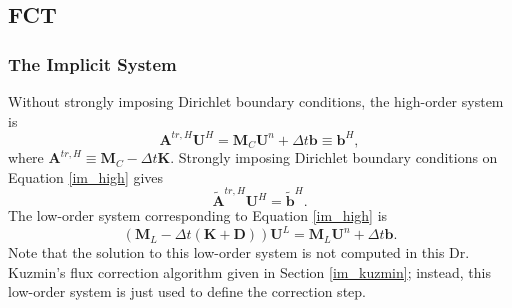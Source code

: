 \subsection{FCT}
\subsubsection{The Implicit System}
Without strongly imposing Dirichlet boundary conditions, the high-order system is
\begin{equation}\label{im_high}
   \mathbf{A}^{tr,H}\mathbf{U}^H
      = \mathbf{M}_C\mathbf{U}^n + \Delta t\mathbf{b} \equiv \mathbf{b}^H,
\end{equation}
where $\mathbf{A}^{tr,H} \equiv \mathbf{M}_C-\Delta t\mathbf{K}$.
Strongly imposing Dirichlet boundary conditions on Equation \ref{im_high}
gives
\begin{equation}\label{im_highD}
   \tilde{\mathbf{A}}^{tr,H}\mathbf{U}^H
      = \tilde{\mathbf{b}}^H.
\end{equation}
The low-order system corresponding to Equation \ref{im_high} is
\begin{equation}\label{im_low}
   (\mathbf{M}_L-\Delta t(\mathbf{K}+\mathbf{D}))\mathbf{U}^L
      = \mathbf{M}_L\mathbf{U}^n + \Delta t\mathbf{b}.
\end{equation}
Note that the solution to this low-order system
is not computed in this Dr. Kuzmin's flux correction algorithm given in Section
\ref{im_kuzmin}; instead, this low-order system is just used
to define the correction step.
